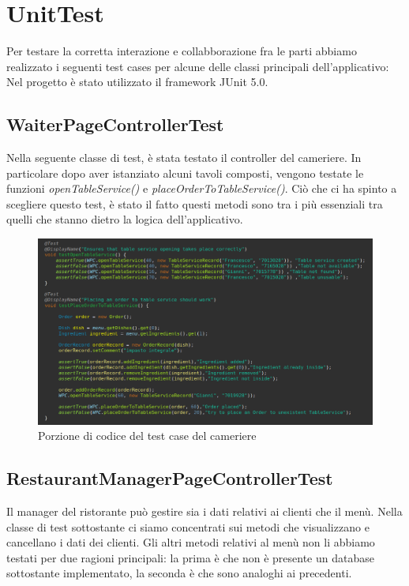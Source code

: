 \documentclass{article}
\begin{document}
\newpage

\section{UnitTest}
Per testare la corretta interazione e collabborazione fra le parti abbiamo realizzato i seguenti test cases per alcune delle classi principali dell’applicativo: \\
\newline
Nel progetto \`e stato utilizzato il framework JUnit 5.0.

\subsection{WaiterPageControllerTest}

Nella seguente classe di test, \`e stata testato il controller del cameriere. In particolare dopo aver istanziato alcuni tavoli composti, vengono testate le funzioni \textit{openTableService()} e \textit{placeOrderToTableService()}. Ci\`o che ci ha spinto a scegliere questo test, \`e stato il fatto questi metodi sono tra i pi\`u essenziali tra quelli che stanno dietro la logica dell’applicativo.

\begin{figure}[!h]
\centering
\includegraphics[width= 12cm]{"Codice/TestCameriere.PNG"}
\caption{Porzione di codice del test case del cameriere}
\end{figure}

\newpage

\subsection{RestaurantManagerPageControllerTest}

Il manager del ristorante pu\`o gestire sia i dati relativi ai clienti che il men\`u. Nella classe di test sottostante ci siamo concentrati sui metodi che visualizzano e cancellano i dati dei clienti. Gli altri metodi relativi al men\`u non li abbiamo testati per due ragioni principali: la prima \`e che non \`e presente un database sottostante implementato, la seconda \`e che sono analoghi ai precedenti.
\end{document}
